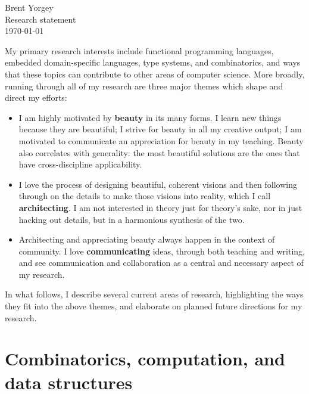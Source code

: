 \documentclass[12pt]{article}
\begin{document}
\noindent Brent Yorgey \\
Research statement \\
\today
\bigskip

My primary research interests include functional programming
languages, embedded domain-specific languages, type systems, and
combinatorics, and ways that these topics can contribute to other
areas of computer science.  More broadly, running through all of my
research are three major themes which shape and direct my efforts:

\begin{itemize}
\item I am highly motivated by \textbf{beauty} in its many forms.  I
  learn new things because they are beautiful; I strive for beauty in
  all my creative output; I am motivated to communicate an
  appreciation for beauty in my teaching.  Beauty also correlates
  with generality: the most beautiful solutions are the ones that have
  cross-discipline applicability.
\item I love the process of designing beautiful, coherent visions and
  then following through on the details to make those visions into
  reality, which I call \textbf{architecting}.  I am not interested in
  theory just for theory's sake, nor in just hacking out details, but
  in a harmonious synthesis of the two.
\item Architecting and appreciating beauty always happen in the
  context of community.  I love \textbf{communicating} ideas, through
  both teaching and writing, and see communication and collaboration
  as a central and necessary aspect of my research.
\end{itemize}

In what follows, I describe several current areas of research,
highlighting the ways they fit into the above themes, and elaborate on
planned future directions for my research.


\section*{Combinatorics, computation, and data structures}
\label{sec:combinatorics}
\end{document}
